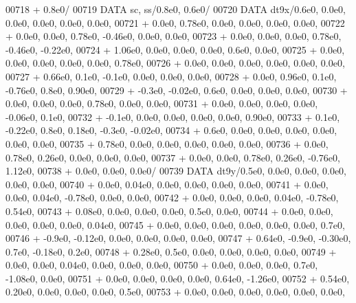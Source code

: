 \begin{DoxyCode}
00718      +                  0.8e0/
00719       \textcolor{keyword}{DATA}              sc, ss/0.8e0, 0.6e0/
00720       \textcolor{keyword}{DATA}              dt9x/0.6e0, 0.0e0, 0.0e0, 0.0e0, 0.0e0, 0.0e0,
00721      +                  0.0e0, 0.78e0, 0.0e0, 0.0e0, 0.0e0, 0.0e0,
00722      +                  0.0e0, 0.0e0, 0.78e0, -0.46e0, 0.0e0, 0.0e0,
00723      +                  0.0e0, 0.0e0, 0.0e0, 0.78e0, -0.46e0, -0.22e0,
00724      +                  1.06e0, 0.0e0, 0.0e0, 0.0e0, 0.6e0, 0.0e0,
00725      +                  0.0e0, 0.0e0, 0.0e0, 0.0e0, 0.0e0, 0.78e0,
00726      +                  0.0e0, 0.0e0, 0.0e0, 0.0e0, 0.0e0, 0.0e0,
00727      +                  0.66e0, 0.1e0, -0.1e0, 0.0e0, 0.0e0, 0.0e0,
00728      +                  0.0e0, 0.96e0, 0.1e0, -0.76e0, 0.8e0, 0.90e0,
00729      +                  -0.3e0, -0.02e0, 0.6e0, 0.0e0, 0.0e0, 0.0e0,
00730      +                  0.0e0, 0.0e0, 0.0e0, 0.78e0, 0.0e0, 0.0e0,
00731      +                  0.0e0, 0.0e0, 0.0e0, 0.0e0, -0.06e0, 0.1e0,
00732      +                  -0.1e0, 0.0e0, 0.0e0, 0.0e0, 0.0e0, 0.90e0,
00733      +                  0.1e0, -0.22e0, 0.8e0, 0.18e0, -0.3e0, -0.02e0,
00734      +                  0.6e0, 0.0e0, 0.0e0, 0.0e0, 0.0e0, 0.0e0, 0.0e0,
00735      +                  0.78e0, 0.0e0, 0.0e0, 0.0e0, 0.0e0, 0.0e0,
00736      +                  0.0e0, 0.78e0, 0.26e0, 0.0e0, 0.0e0, 0.0e0,
00737      +                  0.0e0, 0.0e0, 0.78e0, 0.26e0, -0.76e0, 1.12e0,
00738      +                  0.0e0, 0.0e0, 0.0e0/
00739       \textcolor{keyword}{DATA}              dt9y/0.5e0, 0.0e0, 0.0e0, 0.0e0, 0.0e0, 0.0e0,
00740      +                  0.0e0, 0.04e0, 0.0e0, 0.0e0, 0.0e0, 0.0e0,
00741      +                  0.0e0, 0.0e0, 0.04e0, -0.78e0, 0.0e0, 0.0e0,
00742      +                  0.0e0, 0.0e0, 0.0e0, 0.04e0, -0.78e0, 0.54e0,
00743      +                  0.08e0, 0.0e0, 0.0e0, 0.0e0, 0.5e0, 0.0e0,
00744      +                  0.0e0, 0.0e0, 0.0e0, 0.0e0, 0.0e0, 0.04e0,
00745      +                  0.0e0, 0.0e0, 0.0e0, 0.0e0, 0.0e0, 0.0e0, 0.7e0,
00746      +                  -0.9e0, -0.12e0, 0.0e0, 0.0e0, 0.0e0, 0.0e0,
00747      +                  0.64e0, -0.9e0, -0.30e0, 0.7e0, -0.18e0, 0.2e0,
00748      +                  0.28e0, 0.5e0, 0.0e0, 0.0e0, 0.0e0, 0.0e0,
00749      +                  0.0e0, 0.0e0, 0.04e0, 0.0e0, 0.0e0, 0.0e0,
00750      +                  0.0e0, 0.0e0, 0.0e0, 0.7e0, -1.08e0, 0.0e0,
00751      +                  0.0e0, 0.0e0, 0.0e0, 0.0e0, 0.64e0, -1.26e0,
00752      +                  0.54e0, 0.20e0, 0.0e0, 0.0e0, 0.0e0, 0.5e0,
00753      +                  0.0e0, 0.0e0, 0.0e0, 0.0e0, 0.0e0, 0.0e0,

\end{DoxyCode}
